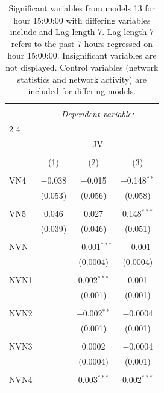 
\begin{table}[!htbp] \centering 
  \caption{Significant variables from models 13 for hour 15:00:00 with differing variables include 
                               and Lag length 7. Lag length 7 refers to the past 7 hours regressed on hour 15:00:00. 
                               Insignificant variables are not displayed. 
                               Control variables (network statistics and network activity) are 
                               included for differing models.} 
  \label{Jmodels2_t_hourlagged2} 
\scriptsize 
\begin{tabular}{@{\extracolsep{5pt}}lccc} 
\\[-1.8ex]\hline 
\hline \\[-1.8ex] 
 & \multicolumn{3}{c}{\textit{Dependent variable:}} \\ 
\cline{2-4} 
\\[-1.8ex] & \multicolumn{3}{c}{JV} \\ 
\\[-1.8ex] & (1) & (2) & (3)\\ 
\hline \\[-1.8ex] 
 VN4 & $-$0.038 & $-$0.015 & $-$0.148$^{**}$ \\ 
  & (0.053) & (0.056) & (0.058) \\ 
  & & & \\ 
 VN5 & 0.046 & 0.027 & 0.148$^{***}$ \\ 
  & (0.039) & (0.046) & (0.051) \\ 
  & & & \\ 
 NVN &  & $-$0.001$^{***}$ & $-$0.001 \\ 
  &  & (0.0004) & (0.0004) \\ 
  & & & \\ 
 NVN1 &  & 0.002$^{***}$ & 0.001 \\ 
  &  & (0.001) & (0.001) \\ 
  & & & \\ 
 NVN2 &  & $-$0.002$^{**}$ & $-$0.0004 \\ 
  &  & (0.001) & (0.001) \\ 
  & & & \\ 
 NVN3 &  & 0.0002 & $-$0.0004 \\ 
  &  & (0.0004) & (0.001) \\ 
  & & & \\ 
 NVN4 &  & 0.003$^{***}$ & 0.002$^{***}$ \\ 

\end{tabular}
\end{table}
